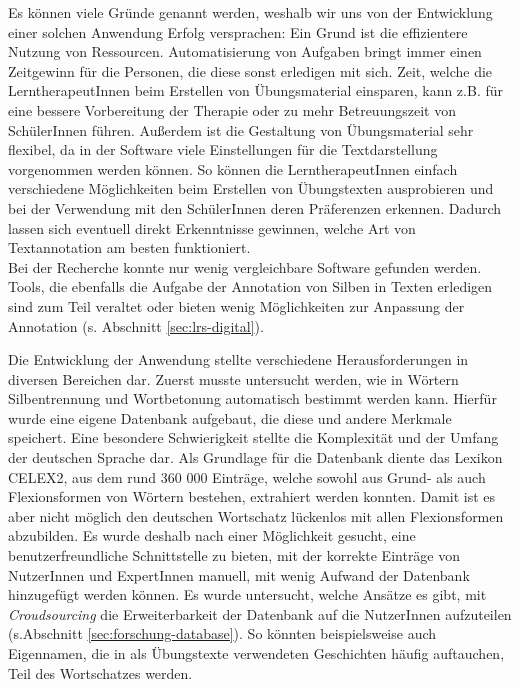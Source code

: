 Es können viele Gründe genannt werden, weshalb wir uns von der Entwicklung einer solchen Anwendung Erfolg versprachen: Ein Grund ist die effizientere Nutzung von Ressourcen. Automatisierung von Aufgaben bringt immer einen Zeitgewinn für die Personen, die diese sonst erledigen mit sich. Zeit, welche die LerntherapeutInnen beim Erstellen von Übungsmaterial einsparen, kann z.B. für eine bessere Vorbereitung der Therapie oder zu mehr Betreuungszeit von SchülerInnen führen. Außerdem ist die Gestaltung von Übungsmaterial sehr flexibel, da in der Software viele Einstellungen für die Textdarstellung vorgenommen werden können. So können die LerntherapeutInnen einfach verschiedene Möglichkeiten beim Erstellen von Übungstexten ausprobieren und bei der Verwendung mit den SchülerInnen deren Präferenzen erkennen. Dadurch lassen sich eventuell direkt Erkenntnisse gewinnen, welche Art von Textannotation am besten funktioniert.\\
Bei der Recherche konnte nur wenig vergleichbare Software gefunden werden. Tools, die ebenfalls die Aufgabe der Annotation von Silben in Texten erledigen sind zum Teil veraltet oder bieten wenig Möglichkeiten zur Anpassung der Annotation (s. Abschnitt \ref{sec:lrs-digital}).

Die Entwicklung der Anwendung stellte verschiedene Herausforderungen in diversen Bereichen dar. Zuerst musste untersucht werden, wie in Wörtern Silbentrennung und Wortbetonung automatisch bestimmt werden kann. Hierfür wurde eine eigene Datenbank aufgebaut, die diese und andere Merkmale speichert. Eine besondere Schwierigkeit stellte die Komplexität und der Umfang der deutschen Sprache dar. Als Grundlage für die Datenbank diente das Lexikon CELEX2\cite{Burnage1990}, aus dem rund 360 000 Einträge, welche sowohl aus Grund- als auch Flexionsformen von Wörtern bestehen, extrahiert werden konnten. Damit ist es aber nicht möglich den deutschen Wortschatz lückenlos mit allen Flexionsformen abzubilden. Es wurde deshalb nach einer Möglichkeit gesucht, eine benutzerfreundliche Schnittstelle zu bieten, mit der korrekte Einträge von NutzerInnen und ExpertInnen manuell, mit wenig Aufwand der Datenbank hinzugefügt werden können. Es wurde untersucht, welche Ansätze es gibt, mit \textit{Croudsourcing} die Erweiterbarkeit der Datenbank auf die NutzerInnen aufzuteilen (s.Abschnitt \ref{sec:forschung-database}). So könnten beispielsweise auch Eigennamen, die in als Übungstexte verwendeten Geschichten häufig auftauchen, Teil des Wortschatzes werden.\\

